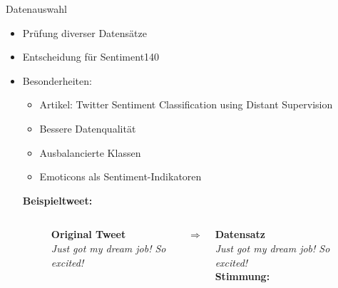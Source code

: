 \documentclass[aspectratio=169]{beamer} %
\begin{document}
\begin{frame}{Datenauswahl}
  \begin{itemize}
      \item Prüfung diverser Datensätze
      \item Entscheidung für \glqq Sentiment140\grqq
      \item Besonderheiten:
      \begin{itemize}
          \item Artikel: \glqq Twitter Sentiment Classification using Distant Supervision\grqq
          \item Bessere Datenqualität
          \item Ausbalancierte Klassen
          \item Emoticons als Sentiment-Indikatoren         
      \end{itemize}

      \vspace{0.5cm}
  \textbf{Beispieltweet:}
  \vspace{0.2cm}

\begin{figure}
    \centering
    \begin{columns}[T]
        \begin{column}{0.45\textwidth}
            \centering
            \textbf{Original Tweet}\\
            \textit{Just got my dream job! So excited! \yellowhighlight{:)}}
            \vspace{0.5cm}
        \end{column}

        \begin{column}{0.1\textwidth}
            \centering
            \LARGE $\Rightarrow$
        \end{column}

        \begin{column}{0.45\textwidth}
            \centering
            \textbf{Datensatz}\\
            \textit{Just got my dream job! So excited!} \\
            \vspace{0.2cm}
            \textbf{Stimmung: }
            \vspace{0.5cm}
        \end{column}
    \end{columns}
\end{figure}

  \end{itemize}
\end{frame}
\end{document}
